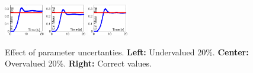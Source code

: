 \documentclass[conference,letterpaper]{ieeeconf}
\begin{document}
\begin{figure}
  \centering
  \includegraphics[width=0.155\textwidth]{Figures/param_error2.eps}
  \includegraphics[width=0.155\textwidth]{Figures/param_error3.eps}
  \includegraphics[width=0.155\textwidth]{Figures/param_error1.eps}
  \caption{Effect of parameter uncertanties. \textbf{Left: } Undervalued 20\%. \textbf{Center: } Overvalued 20\%. \textbf{Right:} Correct values.}
  \label{fig:ParamError}
\end{figure}
\end{document}
